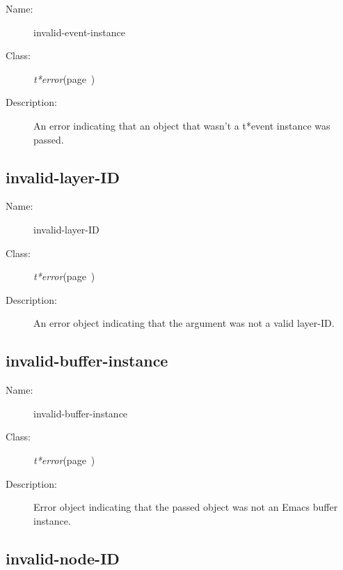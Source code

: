 \begin{description}
\item [Name:]  invalid-event-instance

\item [Class:] {\sl t*error}\hfill(page~\pageref{t*error})

\item [Description:]

An error indicating that an object that wasn't a
t*event instance was passed. 


\end{description}
\horizontalline

\subsection{invalid-layer-ID}
\label{invalid-layer-ID}

\begin{description}
\item [Name:]  invalid-layer-ID

\item [Class:] {\sl t*error}\hfill(page~\pageref{t*error})

\item [Description:]

An error object indicating that the argument was
not a valid layer-ID.


\end{description}
\horizontalline

\subsection{invalid-buffer-instance}
\label{invalid-buffer-instance}

\begin{description}
\item [Name:]  invalid-buffer-instance

\item [Class:] {\sl t*error}\hfill(page~\pageref{t*error})

\item [Description:]

Error object indicating that the passed object
was not an Emacs buffer instance.


\end{description}
\horizontalline

\subsection{invalid-node-ID}
\label{invalid-node-ID}

